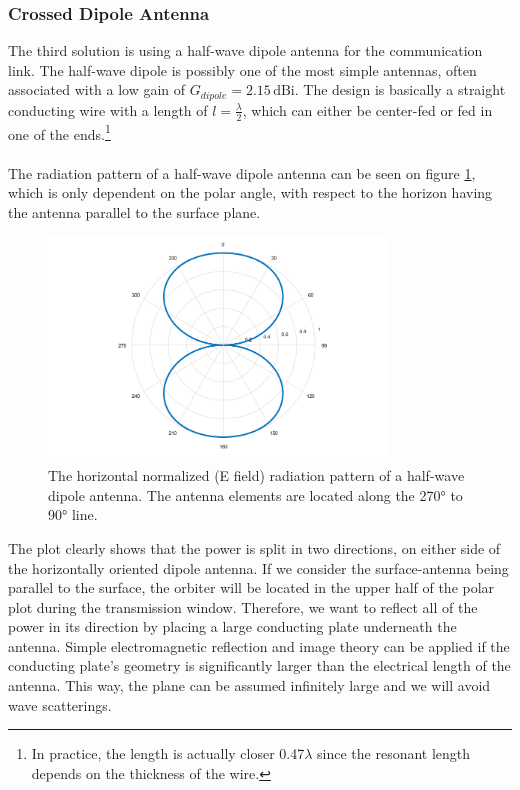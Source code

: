 \subsubsection{Crossed Dipole Antenna}
The third solution is using a half-wave dipole antenna for the communication link. The half-wave dipole is possibly one of the most simple antennas, often associated with a low gain of $G_{dipole}=2.15\,\mathrm{dBi}$. The design is basically a straight conducting wire with a length of $l=\frac{\lambda}{2}$, which can either be center-fed or fed in one of the ends.\footnote{In practice, the length is actually closer 0.47$\lambda$ since the resonant length depends on the thickness of the wire.}\\
\\
The radiation pattern of a half-wave dipole antenna can be seen on figure \ref{fig:singeldip}, which is only dependent on the polar angle, with respect to the horizon having the antenna parallel to the surface plane.
\begin{figure}[!htb]
	\centering
	\includegraphics[width=0.80\textwidth]{figures/Rasmus/dipalone1}
	\caption{The horizontal normalized (E field) radiation pattern of a half-wave dipole antenna. The antenna elements are located along the 270° to 90° line.
	\label{fig:singeldip}}
\end{figure}
The plot clearly shows that the power is split in two directions, on either side of the horizontally oriented dipole antenna. If we consider the surface-antenna being parallel to the surface, the orbiter will be located in the upper half of the polar plot during the transmission window. Therefore, we want to reflect all of the power in its direction by placing a large conducting plate underneath the antenna. Simple electromagnetic reflection and image theory can be applied if the conducting plate's geometry is significantly larger than the electrical length of the antenna. This way, the plane can be assumed infinitely large and we will avoid wave scatterings.\\
